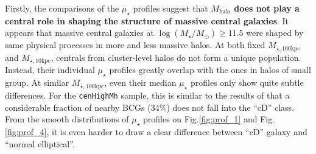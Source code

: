 \documentclass{emulateapj}
\def\rbcg{\texttt{cenHighMh}}
\def\mhalo{{$M_{\mathrm{halo}}$}}
\def\logms{{$\log (M_{\star}/M_{\odot})$}}
\def\minn{{$M_{\star,10\mathrm{kpc}}$}}
\def\mtot{{$M_{\star,100\mathrm{kpc}}$}}
\def\mden{{$\mu_{\star}$}}
\begin{document}
\begin{CJK*}{UTF8}{gbsn}
    Firstly, the comparisons of the \mden{} profiles suggest that \textbf{\mhalo{} does 
    not play a central role in shaping the structure of massive central galaxies}.  
    It appears that massive central galaxies at \logms{}$\geq 11.5$ were shaped by 
    same physical processes in more and less massive halos.  
    At both fixed \mtot{} and \minn{}, centrals from cluster-level halos do not form a 
    unique population. 
    Instead, their individual \mden{} profiles greatly overlap with the ones in halos of 
    small group. 
    At similar \mtot{}, even their median \mden{} profiles only show quite subtle 
    differences. 
    For the \rbcg{} sample, this is similar to the results of \citep{Zhao2015} that 
    a considerable fraction of nearby BCGs (34\%) does not fall into the ``cD'' class.
    From the smooth distributions of \mden{} profiles on Fig.\ref{fig:prof_1} 
    and Fig.\ref{fig:prof_4}, it is even harder to draw a clear difference 
    between ``cD'' galaxy and ``normal elliptical''. 
 

\end{CJK*}
\end{document}
